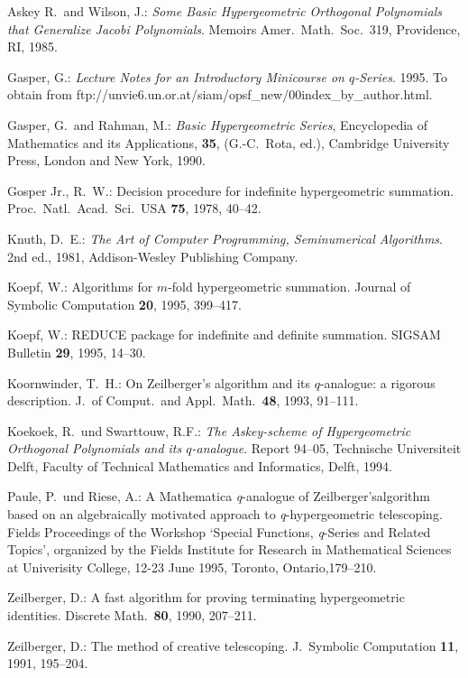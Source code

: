 
\begin{thebibliography}{99}

Askey R.\ and Wilson, J.:
{\sl Some Basic Hypergeometric Orthogonal Polynomials that Generalize Jacobi
Polynomials}. Memoirs Amer.\ Math.\ Soc.\ 319, Providence, RI, 1985.

Gasper, G.:
{\sl Lecture Notes for an Introductory Minicourse on $q$-Series}.
1995. To obtain from  
ftp://unvie6.un.or.at/siam/opsf\_new/\linebreak 00index\_by\_author.html.

Gasper, G.\ and Rahman, M.:
{\sl Basic Hypergeometric Series},
Encyclopedia of Mathematics and its Applications, 
{\bf 35}, (G.-C.\ Rota, ed.), Cambridge University Press,
London and New York, 1990.

Gosper Jr., R.\ W.:
Decision procedure for indefinite hypergeometric
summation. Proc.\ Natl.\ Acad.\ Sci.\ USA {\bf 75}, 1978, 40--42.

Knuth, D.\ E.:
{\sl The Art of Computer Programming, Seminumerical Algorithms}.
2nd ed., 1981, Addison-Wesley Publishing Company.

Koepf, W.:
Algorithms for $m$-fold hypergeometric summation.
Journal of Symbolic Computation {\bf 20}, 1995, 399--417.

Koepf, W.:
REDUCE package for indefinite and definite summation.
SIGSAM Bulletin {\bf 29}, 1995, 14--30.

Koornwinder, T.\ H.:
On Zeilberger's algorithm and its $q$-analogue: a rigorous description.
J.\ of Comput.\ and Appl.\ Math.\ {\bf 48}, 1993, 91--111.

Koekoek, R.\ und Swarttouw, R.F.:
{\sl The Askey-scheme of Hypergeometric Orthogonal
Polynomials and its $q$-analogue}. Report 94--05, Tech\-nische Universiteit
Delft, Faculty of Technical Mathematics and Informatics, Delft, 1994.


Paule, P.\ und Riese, A.:
A Mathematica \textsl{q}-analogue of Zeilberger's\linebreak[4]
algorithm based on an
algebraically motivated approach to \textsl{q}-hyper\-geometric telescoping.
Fields Proceedings of the Workshop `Special Functions, \textsl{q}-Series
and Related Topics', organized by the Fields Institute for Research in
Mathematical Sciences at Univerisity College,
12-23 June 1995, Toronto, Ontario,179--210.

Zeilberger, D.:
A fast algorithm for proving terminating hypergeometric identities.
Discrete Math.\ {\bf 80}, 1990, 207--211.

Zeilberger, D.:
The method of creative telescoping.
J.\ Symbolic Computation {\bf 11}, 1991, 195--204.

\end{thebibliography}

